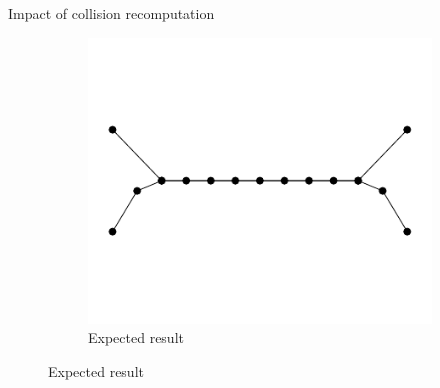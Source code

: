 \documentclass[aspectratio=1610,t,10pt]{beamer}
\begin{document}
\begin{frame}
\begin{columns}[t]
\begin{column}{.48\textwidth}
\begin{block}{Impact of collision recomputation}
\begin{figure}
\begin{subfigure}[t]{0.48\textwidth}
				\includegraphics[width=0.8\linewidth]{img/res-collision/disloc-plot-2}
				\caption{Expected result}
			\end{subfigure}
			

\end{figure}
\end{block}
\end{column}
\end{columns}
\end{frame}
\end{document}
